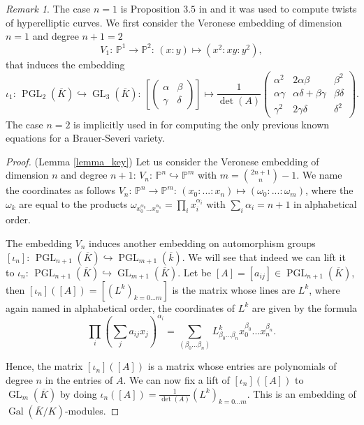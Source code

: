 \documentclass[a4paper,10pt]{amsart}
\theoremstyle{plain}
\theoremstyle{definition}
\theoremstyle{remark}
\newtheorem{remark}[theorem]{Remark}
\numberwithin{equation}{section}
\begin{document}
\begin{remark} The case $n=1$ is Proposition $3.5$ in \cite{LomLor} and it was used to compute twists of hyperelliptic curves. We first consider the Veronese embedding of dimension $n=1$ and degree $n+1=2$
	$$
	V_1:\,\mathbb{P}^1\rightarrow\mathbb{P}^2:\,(x:y)\mapsto(x^2:xy:y^2),
	$$
that induces the embedding	
	$$
	\iota_1:\,\operatorname{PGL}_{2}(\overline{K})\hookrightarrow\operatorname{GL}_3(\overline{K}):\,\left[\begin{pmatrix}\alpha & \beta \\ \gamma & \delta\end{pmatrix}\right]\mapsto\frac{1}{\operatorname{det}(A)}\begin{pmatrix}\alpha^2 & 2\alpha\beta & \beta^2 \\ \alpha\gamma & \alpha\delta+\beta\gamma & \beta\delta \\ \gamma^2 & 2\gamma\delta & \delta^2\end{pmatrix}.
	$$
	 The case $n=2$ is implicitly used in \cite{BaBaEl1} for computing the only previous known equations for a Brauer-Severi variety.
\end{remark}

\begin{proof} (Lemma \ref{lemma_key}) Let us consider the Veronese embedding of dimension $n$ and degree $n+1$: $V_n:\,\mathbb{P}^n\hookrightarrow\mathbb{P}^m$ with $m=\binom{2n+1}{n}-1$. We name the coordinates as follows $V_n:\,\mathbb{P}^n\rightarrow\mathbb{P}^m:\,(x_0:...:x_n)\mapsto(\omega_0:...:\omega_m)$, where the $\omega_k$ are equal to the products $\omega_{x_{0}^{\alpha_0}\dots x_{n}^{\alpha_n}}=\prod_{i}x_{i}^{\alpha_i}$ with $\sum_{i}\alpha_i=n+1$ in alphabetical order. 
	
The embedding $V_n$ induces another embedding on automorphism groups $[\iota_n]:\,\operatorname{PGL}_{n+1}(\overline{K})\hookrightarrow\operatorname{PGL}_{m+1}(\overline{k})$. We will see that indeed we can lift it to $\iota_n:\,\operatorname{PGL}_{n+1}(\overline{K})\hookrightarrow\operatorname{GL}_{m+1}(\overline{K})$. Let be $[A]=[a_{ij}]\in\operatorname{PGL}_{n+1}(\overline{K})$, then $[\iota_n]([A])=[(L^k)_{k=0...m}]$ is the matrix whose lines are $L^k$, where again named in alphabetical order, the coordinates of $L^k$ are given by the formula
$$
\prod_i(\sum_j a_{ij}x_j)^{\alpha_i}=\sum_{(\beta_0...\beta_n)}L^k_{\beta_0...\beta_n}x_{0}^{\beta_0}...x_{n}^{\beta_n}.
$$

Hence, the matrix $[\iota_n]([A])$ is a matrix whose entries are polynomials of degree $n$ in the entries of $A$. We can now fix a lift of $[\iota_n]([A])$ to $\operatorname{GL}_m(\overline{K})$ by doing $\iota_n([A])=\frac{1}{\operatorname{det}({A})}(L^k)_{k=0...m}$. This is an embedding of $\operatorname{Gal}(\overline{K}/K)$-modules.
\end{proof}
\end{document}
